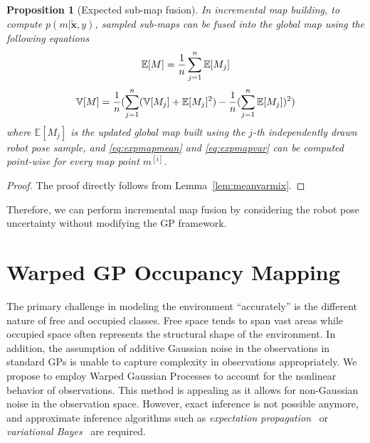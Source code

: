\documentclass[letterpaper, 10 pt, journal, twoside]{IEEEtran}  %
\newtheorem{proposition}[theorem]{Proposition}
\begin{document}
\begin{proposition}[Expected sub-map fusion]
 In incremental map building, to compute $p(m|\boldsymbol{\tilde{x}},y)$, sampled sub-maps can be fused into the global map using the following equations
 \begin{equation}
 \small
 \label{eq:expmapmean}
  \mathbb{E}[M] = \frac{1}{n}\sum_{j=1}^n \mathbb{E}[M_j]
 \end{equation}
 \begin{equation}
 \small
 \label{eq:expmapvar}
  \mathbb{V}[M] = \frac{1}{n} (\sum_{j=1}^n (\mathbb{V}[M_j] + \mathbb{E}[M_j]^2) - \frac{1}{n} (\sum_{j=1}^n \mathbb{E}[M_j])^2)
 \end{equation}
 where $\mathbb{E}[M_j]$ is the updated global map built using the $j$-th independently drawn robot pose sample, and \eqref{eq:expmapmean} and \eqref{eq:expmapvar} can be computed point-wise for every map point $m^{[i]}$.
\end{proposition}
\begin{proof}
 The proof directly follows from Lemma~\ref{lem:meanvarmix}.
\end{proof}

Therefore, we can perform incremental map fusion by considering the robot pose uncertainty without modifying the GP framework. 

\section{Warped GP Occupancy Mapping}
\label{sec:Warped}
The primary challenge in modeling the environment ``accurately'' is the different nature of free and occupied classes. Free space tends to span vast areas while occupied space often represents the structural shape of the environment. In addition, the assumption of additive Gaussian noise in the observations in standard GPs is unable to capture complexity in observations appropriately. We propose to employ Warped Gaussian Processes to account for the nonlinear behavior of observations. This method is appealing as it allows for non-Gaussian noise in the observation space. However, exact inference is not possible anymore, and approximate inference algorithms such as \emph{expectation propagation}~\cite{minka2001family} or \emph{variational Bayes}~\cite{jordan1999introduction} are required.
\end{document}
